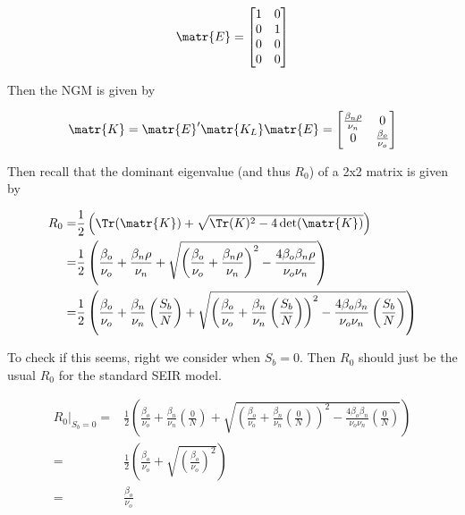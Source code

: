 \documentclass[11pt]{article}
\begin{document}
\[ \matr{E} = \begin{bmatrix} 1 & 0 \\ 0 & 1 \\ 0 & 0 \\ 0 & 0 \end{bmatrix} \]

Then the NGM is given by

\[
	\matr{K} = \matr{E}^\prime \matr{K_L} \matr{E} = 
	\begin{bmatrix} 
	\frac{\beta_n \rho}{\nu_n} & 0 \\
0 & \frac{\beta_o}{\nu_o} \\ \end{bmatrix}
\]

Then recall that the dominant eigenvalue (and thus \( R_0 \)) of a 2x2 matrix is given by


\begin{align*}
	R_0 =& \frac{1}{2} \left( \Tr(\matr{K}) + \sqrt{\Tr({K})^2 - 4\det(\matr{K})} \right)\\
	=&	\frac{1}{2} \left( \frac{\beta_o}{\nu_o} + \frac{\beta_n \rho}{\nu_n} + \sqrt{\left( \frac{\beta_o}{\nu_o} + \frac{\beta_n \rho}{\nu_n} \right)^{2} - \frac{ 4 \beta_o \beta_n \rho}{\nu_o \nu_n}}\right)\\
	=&	\frac{1}{2} \left( \frac{\beta_o}{\nu_o} + \frac{\beta_n}{\nu_n}\left(\frac{S_b}{N}\right) + \sqrt{\left( \frac{\beta_o}{\nu_o} + \frac{\beta_n}{\nu_n}\left(\frac{S_b}{N}\right) \right)^{2} - \frac{ 4 \beta_o \beta_n}{\nu_o \nu_n}\left(\frac{S_b}{N}\right)}\right)
\end{align*}


To check if this seems, right we consider when \( S_b = 0 \).
Then \( R_0 \) should just be the usual \(  R_0 \) for the standard SEIR model.



\begin{align*}
	R_0\rvert_{S_b = 0} =& \frac{1}{2} \left( \frac{\beta_o}{\nu_o} + \frac{\beta_n}{\nu_n}\left(\frac{0}{N}\right) + \sqrt{\left( \frac{\beta_o}{\nu_o} + \frac{\beta_n}{\nu_n}\left(\frac{0}{N}\right) \right)^{2} - \frac{ 4 \beta_o \beta_n}{\nu_o \nu_n}\left(\frac{0}{N}\right)}\right)\\
	=& \frac{1}{2} \left( \frac{\beta_o}{\nu_o} + \sqrt{\left( \frac{\beta_o}{\nu_o} \right)^{2}}\right)\\
	=& \frac{\beta_o}{\nu_o}
\end{align*}
\end{document}
